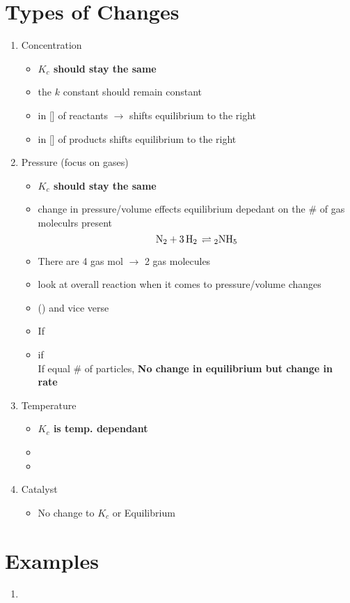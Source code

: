\documentclass{article}
\begin{document}
\section{Types of Changes}
\begin{enumerate}
\item Concentration \begin{itemize} \item \textbf{$K_{c}$ should stay the same} \item the $k$ constant should remain constant \item \ce{^} in [] of reactants $\rightarrow$ shifts equilibrium to the right \item {} in [] of products shifts equilibrium to the right \end{itemize}
\item Pressure (focus on gases) \begin{itemize} \item \textbf{$K_{c}$ should stay the same} \item change in pressure/volume effects equilibrium depedant on the \# of gas moleculrs present\\ $$\ce{N2 + 3H2 \rightleftharpoons 2NH5}$$ \item There are 4 gas mol $\rightarrow$ 2 gas molecules \item look at overall reaction when it comes to pressure/volume changes \item () and vice verse \item If  \item if \\ If equal \# of particles, \textbf{No change in equilibrium but change in rate} \end{itemize}
\item Temperature \begin{itemize} \item \textbf{$K_{c}$ is temp. dependant} \item {} \item {} \end{itemize}
\item Catalyst \begin{itemize} \item No change to $K_{c}$ or Equilibrium \end{itemize}

\end{enumerate}


\section{Examples}
\begin{enumerate}
\item 


\end{enumerate}
\end{document}
